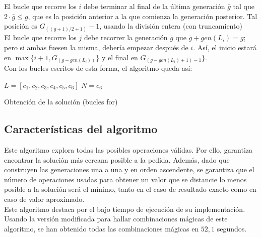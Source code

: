 El bucle que recorre los $i$ debe terminar al final de la última generación $\bar g$ tal que $2\cdot \bar g \le g$, que es la posición anterior a la que comienza la generación posterior. Tal posición es $G_{((g+1)/2+1)}-1$, usando la división entera (con truncamiento)\\

El bucle que recorre los $j$ debe recorrer la generación $\bar g$ que $\bar g + gen(L_i) = g$; pero si ambas fuesen la misma, debería empezar después de $i$. Así, el inicio estará en $\max \{i+1, G_{(g-gen(L_i))}\}$ y el final en $G_{(g-gen(L_i)+1)-1}\}$.\\

Con los bucles escritos de esta forma, el algoritmo queda así:

\begin{algorithm}[H]
	
	$L = [c_1, c_2, c_3, c_4, c_5, c_6]$\;
	$N = c_6$\;
	\caption{Obtención de la solución (bucles for)}
\end{algorithm}

\subsection{Características del algoritmo}
Este algoritmo explora todas las posibles operaciones válidas.
Por ello, garantiza encontrar la solución más cercana posible a la pedida.
Además, dado que construyen las generaciones una a una y en orden ascendente,
se garantiza que el número de operaciones usadas para obtener un valor que se
distancie lo menos posible a la solución será el mínimo, tanto en el caso de
resultado exacto como en caso de valor aproximado.\\

Este algoritmo destaca por el bajo tiempo de ejecución de su implementación. Usando la versión modificada para hallar combinaciones mágicas de este algoritmo, se han obtenido todas las combinaciones mágicas en $52,1$ segundos.\\

